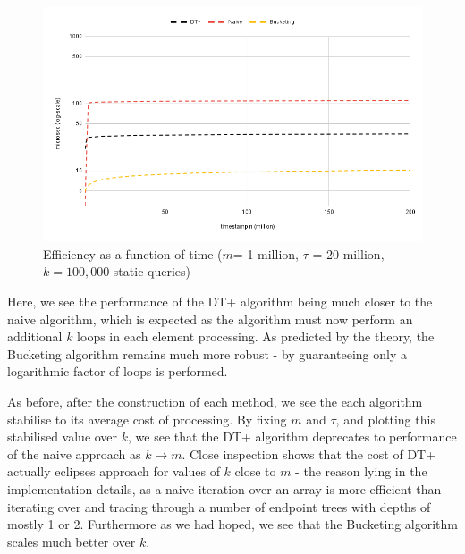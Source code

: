 \begin{center}
\begin{figure}[h]
\centering
\includegraphics[scale=0.45]{thesis/figures/chart2.1.png}
\caption{Efficiency as a function of time ($m$= 1 million, $\tau$ = 20 million, $k=100,000$ static queries)}
\end{figure}
\end{center}

Here, we see the performance of the DT+ algorithm being much closer to the naive algorithm, which is expected as the algorithm must now perform an additional $k$ loops in each element processing. As predicted by the theory, the Bucketing algorithm remains much more robust - by guaranteeing only a logarithmic factor of loops is performed. 

As before, after the construction of each method, we see the each algorithm stabilise to its average cost of processing. By fixing $m$ and $\tau$, and plotting this stabilised value over $k$, we see that the DT+ algorithm deprecates to performance of the naive approach as $k\to m$. Close inspection shows that the cost of DT+ actually eclipses approach for values of $k$ close to $m$ - the reason lying in the implementation details, as a naive iteration over an array is more efficient than iterating over and tracing through a number of endpoint trees with depths of mostly 1 or 2. Furthermore as we had hoped, we see that the Bucketing algorithm scales much better over $k$.


